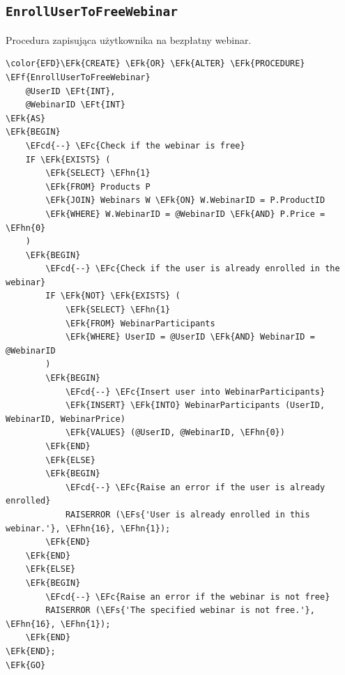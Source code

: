\documentclass[11pt]{article}
\newcommand{\EFc}[1]{\textcolor{EFc}{\textit{#1}}} %
\newcommand{\EFcd}[1]{\textcolor{EFcd}{\textit{#1}}} %
\newcommand{\EFs}[1]{\textcolor{EFs}{#1}} %
\newcommand{\EFk}[1]{\textcolor{EFk}{\textbf{#1}}} %
\newcommand{\EFf}[1]{\textcolor{EFf}{#1}} %
\newcommand{\EFt}[1]{\textcolor{EFt}{\textbf{#1}}} %
\newcommand{\EFhn}[1]{\textcolor{EFhn}{#1}} %
\begin{document}
\subsection{\texttt{EnrollUserToFreeWebinar}}
\label{sec:orgdad869f}
Procedura zapisująca użytkownika na bezpłatny webinar.
\begin{Code}
\begin{Verbatim}
\color{EFD}\EFk{CREATE} \EFk{OR} \EFk{ALTER} \EFk{PROCEDURE} \EFf{EnrollUserToFreeWebinar}
    @UserID \EFt{INT},
    @WebinarID \EFt{INT}
\EFk{AS}
\EFk{BEGIN}
    \EFcd{--} \EFc{Check if the webinar is free}
    IF \EFk{EXISTS} (
        \EFk{SELECT} \EFhn{1}
        \EFk{FROM} Products P
        \EFk{JOIN} Webinars W \EFk{ON} W.WebinarID = P.ProductID
        \EFk{WHERE} W.WebinarID = @WebinarID \EFk{AND} P.Price = \EFhn{0}
    )
    \EFk{BEGIN}
        \EFcd{--} \EFc{Check if the user is already enrolled in the webinar}
        IF \EFk{NOT} \EFk{EXISTS} (
            \EFk{SELECT} \EFhn{1}
            \EFk{FROM} WebinarParticipants
            \EFk{WHERE} UserID = @UserID \EFk{AND} WebinarID = @WebinarID
        )
        \EFk{BEGIN}
            \EFcd{--} \EFc{Insert user into WebinarParticipants}
            \EFk{INSERT} \EFk{INTO} WebinarParticipants (UserID, WebinarID, WebinarPrice)
            \EFk{VALUES} (@UserID, @WebinarID, \EFhn{0})
        \EFk{END}
        \EFk{ELSE}
        \EFk{BEGIN}
            \EFcd{--} \EFc{Raise an error if the user is already enrolled}
            RAISERROR (\EFs{'User is already enrolled in this webinar.'}, \EFhn{16}, \EFhn{1});
        \EFk{END}
    \EFk{END}
    \EFk{ELSE}
    \EFk{BEGIN}
        \EFcd{--} \EFc{Raise an error if the webinar is not free}
        RAISERROR (\EFs{'The specified webinar is not free.'}, \EFhn{16}, \EFhn{1});
    \EFk{END}
\EFk{END};
\EFk{GO}
\end{Verbatim}
\end{Code}
\end{document}
